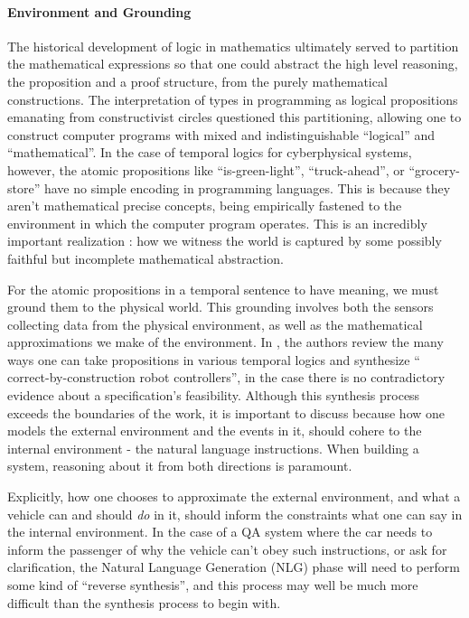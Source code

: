 \documentclass[a4paper, 11pt]{article}
\begin{document}
\paragraph{Environment and Grounding}

The historical development of logic in mathematics ultimately served to
partition the mathematical expressions so that one could abstract the high level
reasoning, the proposition and a proof structure, from the purely mathematical
constructions. The interpretation of types in programming as logical
propositions emanating from constructivist circles questioned this partitioning,
allowing one to construct computer programs with mixed and indistinguishable
``logical'' and ``mathematical''. In the case of temporal logics for
cyberphysical systems, however, the atomic propositions like ``is-green-light'',
``truck-ahead'', or ``grocery-store'' have no simple encoding in programming
languages. This is because they aren't mathematical precise concepts, being
empirically fastened to the environment in which the computer program operates.
This is an incredibly important realization : how we witness the world is
captured by some possibly faithful but incomplete mathematical abstraction.

For the atomic propositions in a temporal sentence to have meaning, we must
ground them to the physical world. This grounding involves both the sensors
collecting data from the physical environment, as well as the mathematical
approximations we make of the environment. In \cite{synthGazit}, the authors
review the many ways one can take propositions in various temporal logics and
synthesize `` correct-by-construction robot controllers'', in the case there is no
contradictory evidence about a specification's feasibility. Although this
synthesis process exceeds the boundaries of the work, it is important to discuss
because how one models the external environment and the events in it, should
cohere to the internal environment - the natural language instructions. 
When building a system, reasoning about it from both directions is paramount.

Explicitly, how one chooses to approximate the external environment, and what a
vehicle can and should \emph{do} in it, should inform the constraints what
one can say in the internal environment. In the case of a QA system where the
car needs to inform the passenger of why the vehicle can't obey such
instructions, or ask for clarification, the Natural Language Generation (NLG)
phase will need to perform some kind of ``reverse synthesis'', and this process
may well be much more difficult than the synthesis process to begin with.
\end{document}
